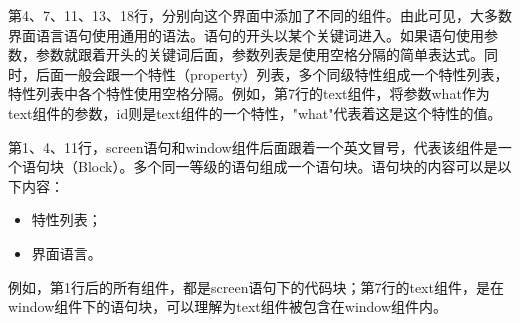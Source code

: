 第4、7、11、13、18行，分别向这个界面中添加了不同的组件。由此可见，大多数界面语言语句使用通用的语法。语句的开头以某个关键词进入。如果语句使用参数，参数就跟着开头的关键词后面，参数列表是使用空格分隔的简单表达式。同时，后面一般会跟一个特性（property）列表，多个同级特性组成一个特性列表，特性列表中各个特性使用空格分隔。例如，第7行的text组件，将参数what作为text组件的参数，id则是text组件的一个特性，"what"代表着这是这个特性的值。


第1、4、11行，screen语句和window组件后面跟着一个英文冒号，代表该组件是一个语句块（Block）。多个同一等级的语句组成一个语句块。语句块的内容可以是以下内容：

\begin{itemize}
    \item 特性列表；
    \item 界面语言。
\end{itemize}

例如，第1行后的所有组件，都是screen语句下的代码块；第7行的text组件，是在window组件下的语句块，可以理解为text组件被包含在window组件内。
